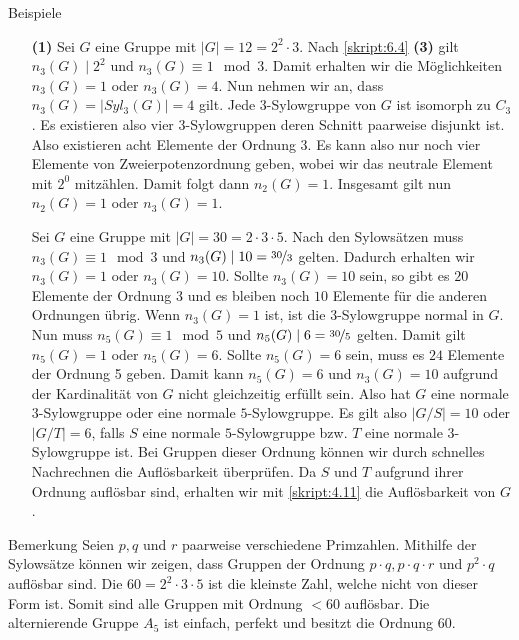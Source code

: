 \begin{genericdf}{Beispiele} \label{skript:6.7}
	\
	\begin{enumerate}
		\item[\textbf{(1)}]
		Sei $ G $ eine Gruppe mit $ |G| = 12 = 2^2 \cdot 3 $.
		Nach \ref{skript:6.4} \textbf{(3)} gilt $ n_3(G) \mid 2^2  $ und 
		$ n_3(G) \equiv 1 \mod 3 $.
		Damit erhalten wir die Möglichkeiten $ n_3(G) = 1 $ oder $ n_3(G)=4 $.
		Nun nehmen wir an, dass $ n_3(G)  = | Syl_3(G)|= 4 $ gilt.
		Jede $ 3 $-Sylowgruppe von $ G $ ist isomorph zu $ C_3 $.
		Es existieren also vier $ 3 $-Sylowgruppen deren Schnitt paarweise disjunkt ist.
		Also existieren acht Elemente der Ordnung $ 3 $. 
		Es kann also nur noch vier Elemente  von Zweierpotenzordnung geben, wobei wir das neutrale Element mit $ 2^0 $ mitzählen. 
		Damit folgt dann $ n_2(G)  =1  $.
		Insgesamt gilt nun $ n_2(G) = 1 $ oder $ n_3(G) = 1 $.
		
		\item[\text{(2)}] 
		Sei $ G $ eine Gruppe mit $ |G| = 30 = 2\cdot 3 \cdot5 $.
		Nach den Sylowsätzen muss $ n_3(G) \equiv 1 \mod 3 $
		und $ n_3(G) \mid 10 = \nicefrac{30}{3} $ gelten.
		Dadurch erhalten wir $ n_3(G) = 1 $ oder $ n_3(G) = 10 $.
		Sollte $ n_3(G) = 10 $ sein, so gibt es $20 $ Elemente der Ordnung $ 3 $
		und es bleiben noch $ 10 $ Elemente für die anderen Ordnungen übrig.
		Wenn $ n_3(G) = 1 $ ist, ist die $ 3 $-Sylowgruppe normal in $ G $.
		Nun muss $ n_5(G) \equiv 1 \mod 5$ und $ n_5(G) \mid 6 = \nicefrac{30}{5} $ gelten.
		Damit gilt $ n_5(G) = 1  $ oder $ n_5(G) =6 $.
		Sollte $ n_5(G) = 6  $ sein, muss es $ 24  $ Elemente der Ordnung 5 geben.
		Damit kann $ n_5(G) = 6 $ und $ n_3(G) =10 $ aufgrund der Kardinalität von $ G $
		nicht gleichzeitig erfüllt sein.
		Also hat $ G $ eine normale $ 3 $-Sylowgruppe oder eine normale $ 5 $-Sylowgruppe.
		Es gilt also $ |G/S| = 10 $ oder $ |G/T| = 6 $, falls $ S $ eine normale $ 5 $-Sylowgruppe 
		bzw. $ T $ eine normale $ 3 $-Sylowgruppe ist.
		Bei Gruppen dieser Ordnung können wir durch schnelles Nachrechnen die Auflösbarkeit  überprüfen.
		Da $ S $ und $ T $ aufgrund ihrer Ordnung auflösbar sind, erhalten wir mit \ref{skript:4.11}
		die Auflösbarkeit von $ G $.
	\end{enumerate}
\end{genericdf}

\begin{genericdf}{Bemerkung} \label{skript:6.8}
	Seien $ p,q $ und $ r $ paarweise verschiedene Primzahlen.
	Mithilfe der Sylowsätze können wir zeigen, dass Gruppen der Ordnung
	$ p\cdot q , p\cdot q\cdot r$ und $p^2\cdot q$ 
	auflösbar sind.
	Die $ 60 = 2^2 \cdot 3 \cdot 5 $ ist die kleinste Zahl, welche nicht von dieser Form ist.
	Somit sind alle Gruppen mit Ordnung $ < 60 $ auflösbar.
	Die alternierende Gruppe $ A_5 $ ist einfach, perfekt und besitzt die Ordnung $ 60 $.
\end{genericdf}

